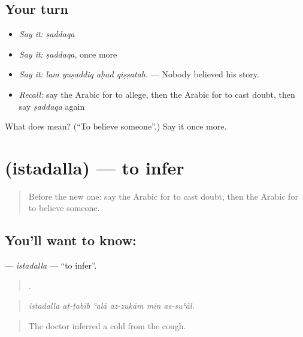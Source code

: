 \subsection*{Your turn}
\begin{itemize}
\raggedright
  \item \emph{Say it:} \emph{ṣaddaqa}
  \item \emph{Say it:} \emph{ṣaddaqa}, once more
  \item \emph{Say it:} \emph{lam yuṣaddiq aḥad qiṣṣatah.} — Nobody believed his story.
  \item \emph{Recall:} say the Arabic for to allege, then the Arabic for to cast doubt, then say \emph{ṣaddaqa} again
\end{itemize}

\begin{tcolorbox}[breakable,colback=teal!4,colframe=teal!35!black,title={Before you move on}]
What does  mean? (\textquotedblleft{}To believe someone\textquotedblright{}.) Say it once more.
\end{tcolorbox}
\section[\texorpdfstring{\ar{استدل} (istadalla)}{استدل (istadalla)}]{ (istadalla) — to infer}

\label{lesson:AR-C366-istadalla}



\begin{quote}
Before the new one: say the Arabic for to cast doubt, then the Arabic for to believe someone.
\end{quote}

\subsection*{You'll want to know: }
\textbf{} — \emph{istadalla} — \textquotedblleft{}to infer\textquotedblright{}.

\begin{quote}
     .
\end{quote}

\begin{quote}
\emph{istadalla aṭ-ṭabīb ʿalā az-zukām min as-suʿāl.}
\end{quote}

\begin{quote}
The doctor inferred a cold from the cough.
\end{quote}

